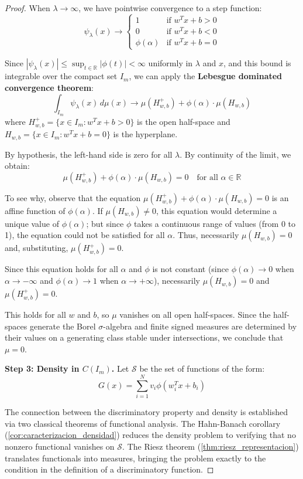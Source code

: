 \begin{proof}
	When \(\lambda \to \infty\), we have pointwise convergence to a step function:
	\[
		\psi_{\lambda}(x) \to \begin{cases}
			                        1 & \text{if } w^T x + b > 0 \\
			                        0 & \text{if } w^T x + b < 0 \\
			                        \phi(\alpha) & \text{if } w^T x + b = 0
		\end{cases}
	\]

	Since \(|\psi_{\lambda}(x)| \leq \sup_{t \in \mathbb{R}} |\phi(t)| < \infty\) uniformly in \(\lambda\) and \(x\), and this bound is integrable over the compact set \(I_m\), we can apply the \textbf{Lebesgue dominated convergence theorem}:
	\[
		\int_{I_m} \psi_{\lambda}(x) \, d\mu(x) \to \mu(H^+_{w,b}) + \phi(\alpha) \cdot \mu(H_{w,b})
	\]
	where \(H^+_{w,b} = \{x \in I_m : w^T x + b > 0\}\) is the open half-space and \(H_{w,b} = \{x \in I_m : w^T x + b = 0\}\) is the hyperplane.

	By hypothesis, the left-hand side is zero for all \(\lambda\). By continuity of the limit, we obtain:
	\[
		\mu(H^+_{w,b}) + \phi(\alpha) \cdot \mu(H_{w,b}) = 0 \quad \text{for all } \alpha \in \mathbb{R}
	\]

	To see why, observe that the equation \(\mu(H^+_{w,b}) + \phi(\alpha) \cdot \mu(H_{w,b}) = 0\) is an affine function of \(\phi(\alpha)\). If \(\mu(H_{w,b}) \neq 0\), this equation would determine a unique value of \(\phi(\alpha)\); but since \(\phi\) takes a continuous range of values (from 0 to 1), the equation could not be satisfied for all \(\alpha\). Thus, necessarily \(\mu(H_{w,b}) = 0\) and, substituting, \(\mu(H^+_{w,b}) = 0\).

	Since this equation holds for all \(\alpha\) and \(\phi\) is not constant (since \(\phi(\alpha) \to 0\) when \(\alpha \to -\infty\) and \(\phi(\alpha) \to 1\) when \(\alpha \to +\infty\)), necessarily \(\mu(H_{w,b}) = 0\) and \(\mu(H^+_{w,b}) = 0\).

	This holds for all \(w\) and \(b\), so \(\mu\) vanishes on all open half-spaces. Since the half-spaces generate the Borel \(\sigma\)-algebra and finite signed measures are determined by their values on a generating class stable under intersections, we conclude that \(\mu = 0\).

	\textbf{Step 3: Density in \(C(I_m)\).}
	Let \(\mathcal{S}\) be the set of functions of the form:
	\[
		G(x) = \sum_{i=1}^{N} v_i \phi(w_i^T x + b_i)
	\]

	The connection between the discriminatory property and density is established via two classical theorems of functional analysis. The Hahn-Banach corollary (\autoref{cor:caracterizacion_densidad}) reduces the density problem to verifying that no nonzero functional vanishes on \(\mathcal{S}\). The Riesz theorem (\autoref{thm:riesz_representacion}) translates functionals into measures, bringing the problem exactly to the condition in the definition of a discriminatory function.


\end{proof}
